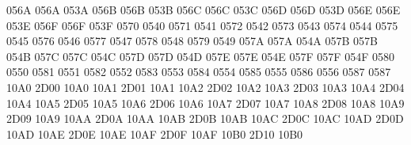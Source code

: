 \setcclcucx 056A 056A 053A %
\setcclcucx 056B 056B 053B %
\setcclcucx 056C 056C 053C %
\setcclcucx 056D 056D 053D %
\setcclcucx 056E 056E 053E %
\setcclcucx 056F 056F 053F %
 0570 0540 %
 0571 0541 %
 0572 0542 %
 0573 0543 %
 0574 0544 %
 0575 0545 %
 0576 0546 %
 0577 0547 %
 0578 0548 %
 0579 0549 %
\setcclcucx 057A 057A 054A %
\setcclcucx 057B 057B 054B %
\setcclcucx 057C 057C 054C %
\setcclcucx 057D 057D 054D %
\setcclcucx 057E 057E 054E %
\setcclcucx 057F 057F 054F %
 0580 0550 %
 0581 0551 %
 0582 0552 %
 0583 0553 %
 0584 0554 %
 0585 0555 %
 0586 0556 %
 0587 0587 %
\setcclcucx 10A0 2D00 10A0 %
\setcclcucx 10A1 2D01 10A1 %
\setcclcucx 10A2 2D02 10A2 %
\setcclcucx 10A3 2D03 10A3 %
\setcclcucx 10A4 2D04 10A4 %
\setcclcucx 10A5 2D05 10A5 %
\setcclcucx 10A6 2D06 10A6 %
\setcclcucx 10A7 2D07 10A7 %
\setcclcucx 10A8 2D08 10A8 %
\setcclcucx 10A9 2D09 10A9 %
\setcclcucx 10AA 2D0A 10AA %
\setcclcucx 10AB 2D0B 10AB %
\setcclcucx 10AC 2D0C 10AC %
\setcclcucx 10AD 2D0D 10AD %
\setcclcucx 10AE 2D0E 10AE %
\setcclcucx 10AF 2D0F 10AF %
\setcclcucx 10B0 2D10 10B0 %
